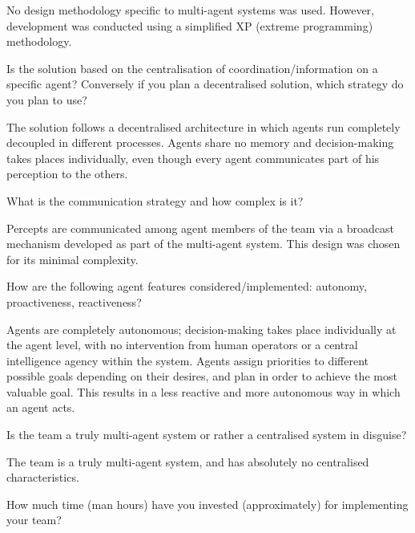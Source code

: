 No design methodology specific to multi-agent systems
was used. However, development was conducted using a simplified XP (extreme
programming) methodology. 

\begin{question}
Is the solution based on the centralisation of coordination/information on
a specific agent? Conversely if you plan a decentralised solution, which
strategy do you plan to use?  
\end{question}

The solution follows a decentralised architecture in which agents run completely decoupled in different processes.
Agents share no memory and decision-making takes places individually, even though every agent communicates part of his perception to the others.

\begin{question}
What is the communication strategy and how complex is it?
\end{question}

Percepts are
communicated among agent members of the team via a broadcast mechanism
developed as part of the multi-agent system. This design was chosen for its
minimal complexity.

\begin{question}
How are the following agent features considered/implemented: autonomy,
proactiveness, reactiveness?  
\end{question}

Agents are completely autonomous;
decision-making takes place individually at the agent level, with no
intervention from human operators or a central intelligence agency within the
system.  Agents assign priorities to different possible goals depending on
their desires, and plan in order to achieve the most valuable goal. This
results in a less reactive and more autonomous way in which an agent acts.

\begin{question}
Is the team a truly multi-agent system or rather a centralised system in
disguise?  
\end{question}

The team is a truly multi-agent system, and has absolutely no
centralised characteristics.

\begin{question}
How much time (man hours) have you invested (approximately) for
implementing your team?  
\end{question}


